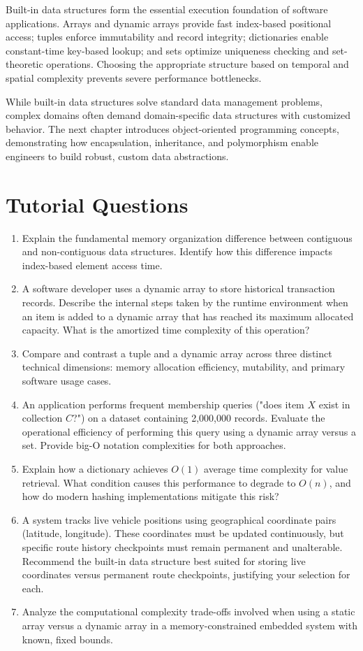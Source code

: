 \documentclass[12pt]{report}
\begin{document}
Built-in data structures form the essential execution foundation of software applications. Arrays and dynamic arrays provide fast index-based positional access; tuples enforce immutability and record integrity; dictionaries enable constant-time key-based lookup; and sets optimize uniqueness checking and set-theoretic operations. Choosing the appropriate structure based on temporal and spatial complexity prevents severe performance bottlenecks.

While built-in data structures solve standard data management problems, complex domains often demand domain-specific data structures with customized behavior. The next chapter introduces object-oriented programming concepts, demonstrating how encapsulation, inheritance, and polymorphism enable engineers to build robust, custom data abstractions.

\section*{Tutorial Questions}

\begin{enumerate}
    \item Explain the fundamental memory organization difference between contiguous and non-contiguous data structures. Identify how this difference impacts index-based element access time.
    \item A software developer uses a dynamic array to store historical transaction records. Describe the internal steps taken by the runtime environment when an item is added to a dynamic array that has reached its maximum allocated capacity. What is the amortized time complexity of this operation?
    \item Compare and contrast a tuple and a dynamic array across three distinct technical dimensions: memory allocation efficiency, mutability, and primary software usage cases.
    \item An application performs frequent membership queries ("does item $X$ exist in collection $C$?") on a dataset containing 2,000,000 records. Evaluate the operational efficiency of performing this query using a dynamic array versus a set. Provide big-O notation complexities for both approaches.
    \item Explain how a dictionary achieves $O(1)$ average time complexity for value retrieval. What condition causes this performance to degrade to $O(n)$, and how do modern hashing implementations mitigate this risk?
    \item A system tracks live vehicle positions using geographical coordinate pairs (latitude, longitude). These coordinates must be updated continuously, but specific route history checkpoints must remain permanent and unalterable. Recommend the built-in data structure best suited for storing live coordinates versus permanent route checkpoints, justifying your selection for each.
    \item Analyze the computational complexity trade-offs involved when using a static array versus a dynamic array in a memory-constrained embedded system with known, fixed bounds.
\end{enumerate}
\end{document}
